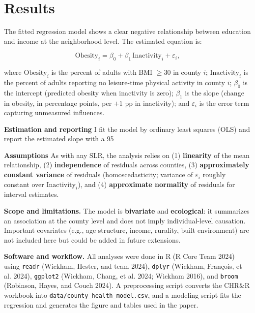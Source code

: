 \documentclass[
  letterpaper,
  DIV=11,
  numbers=noendperiod]{scrartcl}
\begin{document}
\section{Results}\label{results}

The fitted regression model shows a clear negative relationship between
education and income at the neighborhood level. The estimated equation
is:

$$
\text{Obesity}_i = \beta_0 + \beta_1\,\text{Inactivity}_i + \varepsilon_i,
$$


where \( \text{Obesity}_i \) is the percent of adults with BMI \(\ge 30\) in county \( i \); \( \text{Inactivity}_i \) is the percent of adults reporting no leisure-time physical activity in county \( i \); \( \beta_0 \) is the intercept (predicted obesity when inactivity is zero); \( \beta_1 \) is the slope (change in obesity, in percentage points, per \(+1\) pp in inactivity); and \( \varepsilon_i \) is the error term capturing unmeasured influences.

\textbf{Estimation and reporting} I fit the model by ordinary least squares (OLS) and report the estimated slope with a 95%

\textbf{Assumptions} As with any SLR, the analysis relies on (1) \textbf{linearity} of the mean relationship, (2) \textbf{independence} of residuals across counties, (3) \textbf{approximately constant variance} of residuals (homoscedasticity; variance of \( \varepsilon_i \) roughly constant over \( \text{Inactivity}_i \)), and (4) \textbf{approximate normality} of residuals for interval estimates.

\textbf{Scope and limitations.} The model is \textbf{bivariate} and
\textbf{ecological}: it summarizes an association at the county level
and does not imply individual-level causation. Important covariates
(e.g., age structure, income, rurality, built environment) are not
included here but could be added in future extensions.

\textbf{Software and workflow.} All analyses were done in R (R Core Team
2024) using \texttt{readr} (Wickham, Hester, and team 2024),
\texttt{dplyr} (Wickham, François, et al. 2024), \texttt{ggplot2}
(Wickham, Chang, et al. 2024; Wickham 2016), and \texttt{broom}
(Robinson, Hayes, and Couch 2024). A preprocessing script converts the
CHR\&R workbook into \texttt{data/county\_health\_model.csv}, and a
modeling script fits the regression and generates the figure and tables
used in the paper.
\end{document}

